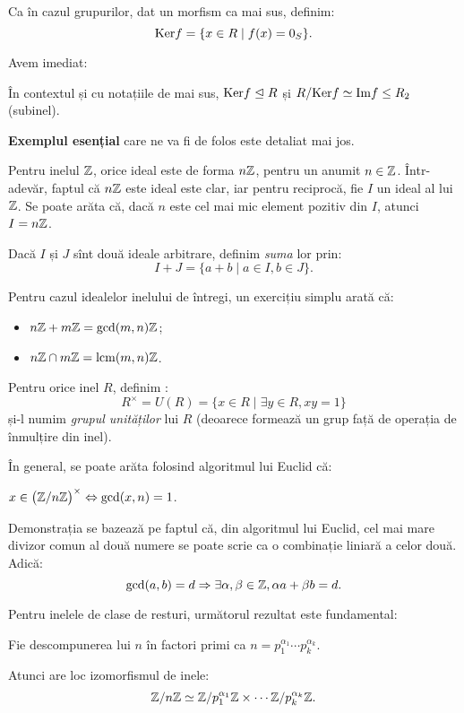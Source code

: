 Ca în cazul grupurilor, dat un morfism ca mai sus, definim:
\[
  \mathrm{Ker}f = \{ x \in R \mid f(x) = 0_S \}.
\]

Avem imediat:
\begin{theorem}
  \label{thm:tfi-inele}
  În contextul și cu notațiile de mai sus, $ \mathrm{Ker}f \trianglelefteq R $
  și $ R/\mathrm{Ker}f \simeq \mathrm{Im}f \leq R_2 $ (subinel).
\end{theorem}

\textbf{Exemplul esențial} care ne va fi de folos este detaliat mai jos.

Pentru inelul $ \mathbb{Z} $, orice ideal este de forma $ n\mathbb{Z} $, pentru un anumit
$ n \in \mathbb{Z} $. Într-adevăr, faptul că $ n\mathbb{Z} $ este ideal este clar, iar pentru
reciprocă, fie $ I $ un ideal al lui $ \mathbb{Z} $. Se poate arăta că, dacă $ n $
este cel mai mic element pozitiv din $ I $, atunci $ I = n\mathbb{Z} $.

Dacă $ I $ și $ J $ sînt două ideale arbitrare, definim \emph{suma} lor prin:
\[
  I + J = \{ a + b \mid a \in I, b \in J \}.
\]

Pentru cazul idealelor inelului de întregi, un exercițiu simplu arată că:
\begin{itemize}
\item $ n \mathbb{Z} + m \mathbb{Z} = \mathrm{gcd}(m, n)\mathbb{Z} $;
\item $ n\mathbb{Z} \cap m \mathbb{Z} = \mathrm{lcm}(m, n) \mathbb{Z} $.
\end{itemize}

Pentru orice inel $ R $, definim :
\[
  R^\times = U(R) = \{ x \in R \mid \exists y \in R, xy = 1 \}
\]
și-l numim \emph{grupul unităților} lui $ R $ (deoarece formează un
grup față de operația de înmulțire din inel).

În general, se poate arăta folosind algoritmul lui Euclid că:
\begin{proposition}\label{pr:unit-zn}
  $ x \in \big(\mathbb{Z}/n\mathbb{Z}\big)^\times \Leftrightarrow \mathrm{gcd}(x, n) = 1 $.
\end{proposition}

Demonstrația se bazează pe faptul că, din algoritmul lui Euclid, cel mai
mare divizor comun al două numere se poate scrie ca o combinație liniară
a celor două. Adică:
\[
  \dr{gcd}(a, b) = d \Rightarrow \exists \alpha, \beta \in \ZZ, %
  \alpha a + \beta b = d.
\]

Pentru inelele de clase de resturi, următorul rezultat este fundamental:
\begin{theorem}\label{thm:chineza}
  Fie descompunerea lui $ n $ în factori primi ca
  $ n = p_1^{\alpha_1} \cdots p_k^{\alpha_k} $.

  Atunci are loc izomorfismul de inele:
  \[
    \mathbb{Z}/n\mathbb{Z} \simeq \mathbb{Z}/p_1^{\alpha_1}\mathbb{Z} \times \cdots \mathbb{Z}/p_k^{\alpha_k}\mathbb{Z}.
  \]
\end{theorem}


